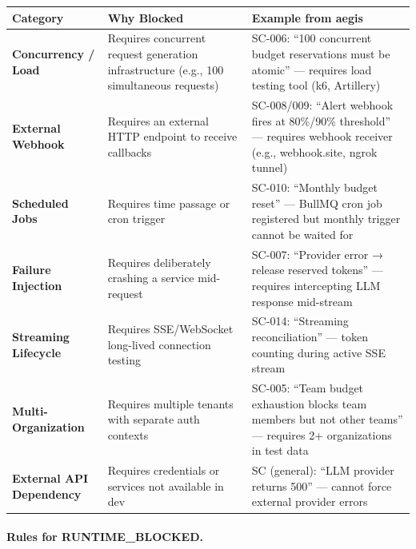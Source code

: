 \documentclass[11pt,a4paper,openright,twoside]{report}
\begin{document}
\begin{longtable}{p{3.5cm}p{4cm}p{5.5cm}}
\toprule
\textbf{Category} & \textbf{Why Blocked} & \textbf{Example from aegis} \\
\midrule
\endhead
\bottomrule
\endfoot

\textbf{Concurrency / Load} &
  Requires concurrent request generation infrastructure (e.g., 100 simultaneous requests) &
  SC-006: ``100 concurrent budget reservations must be atomic'' --- requires load testing tool (k6, Artillery) \\
\addlinespace

\textbf{External Webhook} &
  Requires an external HTTP endpoint to receive callbacks &
  SC-008/009: ``Alert webhook fires at 80\%/90\% threshold'' --- requires webhook receiver (e.g., webhook.site, ngrok tunnel) \\
\addlinespace

\textbf{Scheduled Jobs} &
  Requires time passage or cron trigger &
  SC-010: ``Monthly budget reset'' --- BullMQ cron job registered but monthly trigger cannot be waited for \\
\addlinespace

\textbf{Failure Injection} &
  Requires deliberately crashing a service mid-request &
  SC-007: ``Provider error → release reserved tokens'' --- requires intercepting LLM response mid-stream \\
\addlinespace

\textbf{Streaming Lifecycle} &
  Requires SSE/WebSocket long-lived connection testing &
  SC-014: ``Streaming reconciliation'' --- token counting during active SSE stream \\
\addlinespace

\textbf{Multi-Organization} &
  Requires multiple tenants with separate auth contexts &
  SC-005: ``Team budget exhaustion blocks team members but not other teams'' --- requires 2+ organizations in test data \\
\addlinespace

\textbf{External API Dependency} &
  Requires credentials or services not available in dev &
  SC (general): ``LLM provider returns 500'' --- cannot force external provider errors \\
\bottomrule
\end{longtable}

\paragraph{Rules for RUNTIME\_BLOCKED.}
\end{document}

